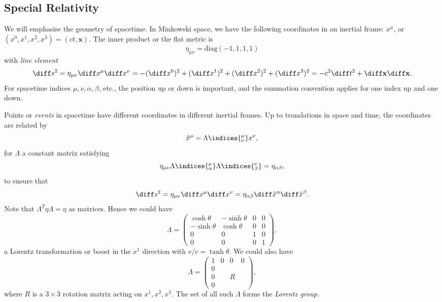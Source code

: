\documentclass[12pt]{article}
\begin{document}
\subsection{Special Relativity}
\label{sub:spec_rel}

We will emphasise the geometry of spacetime. In Minkowski space, we have the following coordinates in an inertial frame: $x^\mu$, or $(x^0, x^1, x^2, x^3) = (ct, \mathbf{x})$. The inner product or the flat metric is
\[
\eta_{\mu \nu} = \mathrm{diag}(-1, 1, 1, 1)
\]
with \emph{line element}
\[
\diff s^2 = \eta_{\mu \nu} \diff x^\mu \diff x^\nu = -(\diff x^0)^2 + (\diff x^1)^2 + (\diff x^2)^2 + (\diff x^3)^2 = - c^2 \diff t^2 + \diff \mathbf{x} \diff \mathbf{x}.
\]
For spacetime indices $\mu, \nu, \alpha, \beta$, etc., the position up or down is important, and the summation convention applies for one index up and one down.


Points or \emph{events} in spacetime have different coordinates in different inertial frames. Up to translations in space and time, the coordinates are related by
\[
	\tilde x^\mu = \Lambda\indices{^\mu_\nu} x^\nu,
\]
for $\Lambda$ a constant matrix satisfying
\[
	\eta_{\mu \nu} \Lambda\indices{^\mu_\alpha} \Lambda\indices{^\nu_\beta} = \eta_{\alpha\beta},
\]
to ensure that
\[
\diff s^2 = \eta_{\mu \nu} \diff x^\mu \diff x^\nu = \eta_{\alpha\beta} \diff \tilde x^\alpha \diff \tilde x^\beta.
\]
Note that $\Lambda^T \eta \Lambda = \eta$ as matrices. Hence we could have
\[
\Lambda =
\begin{pmatrix}
	\cosh \theta & - \sinh \theta & 0 & 0 \\
	- \sinh \theta & \cosh \theta & 0 & 0 \\
	0 & 0 & 1 & 0 \\
	0 & 0 & 0 & 1
\end{pmatrix},
\]
a Lorentz transformation or boost in the $x^1$ direction with $v/c = \tanh \theta$. We could also have
\[
\Lambda =
\begin{pmatrix}
	1 & 0 & 0 & 0 \\
	0 & & & \\
	0 & & R & \\
	0 & & &
\end{pmatrix},
\]
where $R$ is a $3 \times 3$ rotation matrix acting on $x^1, x^2, x^3$. The set of all such $\Lambda$ forms the \emph{Lorentz group}.
\end{document}
